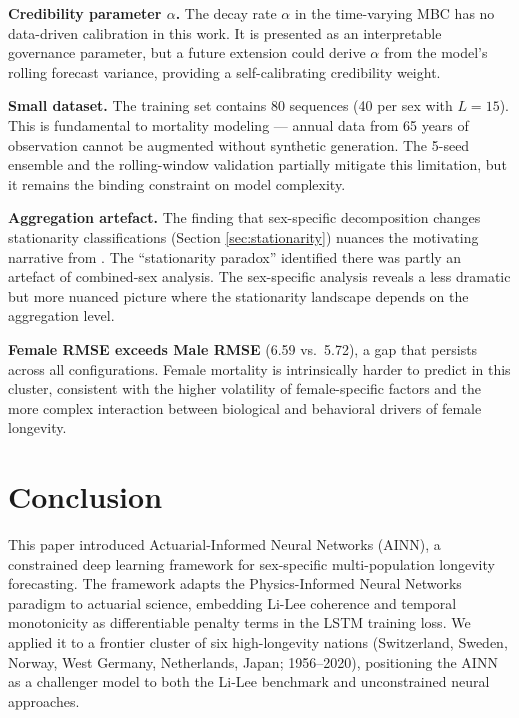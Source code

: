 \documentclass[11pt,a4paper]{article}
\begin{document}
\textbf{Credibility parameter $\alpha$.} The decay rate $\alpha$ in the time-varying MBC has no data-driven calibration in this work. It is presented as an interpretable governance parameter, but a future extension could derive $\alpha$ from the model's rolling forecast variance, providing a self-calibrating credibility weight.

\textbf{Small dataset.} The training set contains 80 sequences (40 per sex with $L = 15$). This is fundamental to mortality modeling --- annual data from 65 years of observation cannot be augmented without synthetic generation. The 5-seed ensemble and the rolling-window validation partially mitigate this limitation, but it remains the binding constraint on model complexity.

\textbf{Aggregation artefact.} The finding that sex-specific decomposition changes stationarity classifications (Section \ref{sec:stationarity}) nuances the motivating narrative from \cite{rindori2026p04}. The ``stationarity paradox'' identified there was partly an artefact of combined-sex analysis. The sex-specific analysis reveals a less dramatic but more nuanced picture where the stationarity landscape depends on the aggregation level.

\textbf{Female RMSE exceeds Male RMSE} (6.59 vs.\ 5.72), a gap that persists across all configurations. Female mortality is intrinsically harder to predict in this cluster, consistent with the higher volatility of female-specific factors and the more complex interaction between biological and behavioral drivers of female longevity.


\section{Conclusion}

This paper introduced Actuarial-Informed Neural Networks (AINN), a constrained deep learning framework for sex-specific multi-population longevity forecasting. The framework adapts the Physics-Informed Neural Networks paradigm to actuarial science, embedding Li-Lee coherence and temporal monotonicity as differentiable penalty terms in the LSTM training loss. We applied it to a frontier cluster of six high-longevity nations (Switzerland, Sweden, Norway, West Germany, Netherlands, Japan; 1956--2020), positioning the AINN as a challenger model to both the Li-Lee benchmark and unconstrained neural approaches.
\end{document}

